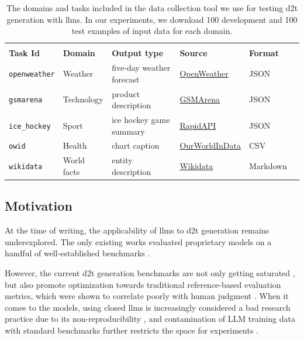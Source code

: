 \begin{table}[ht]
    \small
    \centering
    \begin{tabular}{@{}llllll@{}} \toprule                                                                                                                  \\
        \textbf{Task Id}     & \textbf{Domain} & \textbf{Output type}      & \textbf{Source}                                   & \textbf{Format} \\ \midrule
        \texttt{openweather} & Weather         & five-day weather forecast & \href{https://openweathermap.org}{OpenWeather}    & JSON            \\
        \texttt{gsmarena}    & Technology      & product description       & \href{https://www.gsmarena.com}{GSMArena}         & JSON            \\
        \texttt{ice\_hockey} & Sport           & ice hockey game summary   & \href{https://rapidapi.com}{RapidAPI}             & JSON            \\
        \texttt{owid}        & Health          & chart caption             & \href{https://ourworldindata.org}{OurWorldInData} & CSV             \\
        \texttt{wikidata}    & World facts     & entity description        & \href{https://wikidata.org}{Wikidata}             & Markdown        \\\bottomrule
    \end{tabular}
    \caption[The domains and tasks included in \textsc{Quintd}.]{The domains and tasks included in the \datatool{} data collection tool we use for testing \ac{d2t} generation with \acp{llm}. In our experiments, we download 100 development and 100 test examples of input data for each domain.}
    \label{tab:quintd:data}
\end{table}

\subsection{Motivation}
At the time of writing, the applicability of \acp{llm} \cite{ouyang2022TrainingLM,touvronLlamaOpenFoundation2023,jiangMistral7B2023,tunstallZephyrDirectDistillation2023} to \ac{d2t} generation remains underexplored. The only existing works evaluated proprietary models on a handful of well-established benchmarks \cite{axelssonUsingLargeLanguage2023,yuanEvaluatingGenerativeModels2023}.

However, the current \ac{d2t} generation benchmarks are not only getting saturated \cite{van_miltenburg_barriers_2023}, but also promote optimization towards traditional reference-based evaluation metrics, which were shown to correlate poorly with human judgment \cite{gehrmannRepairingCrackedFoundation2022,vanderleeHumanEvaluationAutomatically2021,novikovaWhyWeNeed2017}. When it comes to the models, using closed \acp{llm} \cite{openai2023gpt4,chatgpt} is increasingly considered a bad research practice due to its non-reproducibility \cite{rogers2023closed,chen2023chatgpt}, and contamination of LLM training data with standard benchmarks further restricts the space for experiments \cite{golchin2023time,aiyappa-etal-2023-trust,balloccu2024leak}.


